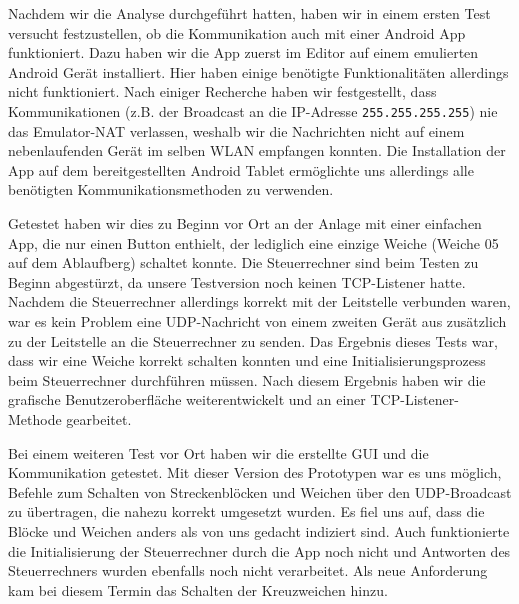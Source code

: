 \documentclass{article}
\begin{document}
Nachdem wir die Analyse durchgeführt hatten, haben wir in einem ersten Test versucht festzustellen, ob die Kommunikation auch mit einer Android App funktioniert.
Dazu haben wir die App zuerst im Editor auf einem emulierten Android Gerät installiert.
Hier haben einige benötigte Funktionalitäten allerdings nicht funktioniert.
Nach einiger Recherche haben wir festgestellt, dass Kommunikationen (z.B. der Broadcast an die IP-Adresse \texttt{255.255.255.255}) nie das Emulator-NAT verlassen, weshalb wir die Nachrichten nicht auf einem nebenlaufenden Gerät im selben WLAN empfangen konnten.
Die Installation der App auf dem bereitgestellten Android Tablet ermöglichte uns allerdings alle benötigten Kommunikationsmethoden zu verwenden.

Getestet haben wir dies zu Beginn vor Ort an der Anlage mit einer einfachen App, die nur einen Button enthielt, der lediglich eine einzige Weiche (Weiche 05 auf dem Ablaufberg) schaltet konnte.
Die Steuerrechner sind beim Testen zu Beginn abgestürzt, da unsere Testversion noch keinen TCP-Listener hatte.
Nachdem die Steuerrechner allerdings korrekt mit der Leitstelle verbunden waren, war es kein Problem eine UDP-Nachricht von einem zweiten Gerät aus zusätzlich zu der Leitstelle an die Steuerrechner zu senden.
Das Ergebnis dieses Tests war, dass wir eine Weiche korrekt schalten konnten und eine Initialisierungsprozess beim Steuerrechner durchführen müssen.
Nach diesem Ergebnis haben wir die grafische Benutzeroberfläche weiterentwickelt und an einer TCP-Listener-Methode gearbeitet.

Bei einem weiteren Test vor Ort haben wir die erstellte GUI und die Kommunikation getestet.
Mit dieser Version des Prototypen war es uns möglich, Befehle zum Schalten von Streckenblöcken und Weichen über den UDP-Broadcast zu übertragen, die nahezu korrekt umgesetzt wurden.
Es fiel uns auf, dass die Blöcke und Weichen anders als von uns gedacht indiziert sind.
Auch funktionierte die Initialisierung der Steuerrechner durch die App noch nicht und Antworten des Steuerrechners wurden ebenfalls noch nicht verarbeitet.
Als neue Anforderung kam bei diesem Termin das Schalten der Kreuzweichen hinzu.
\end{document}
